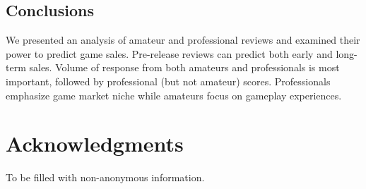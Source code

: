 \documentclass[letterpaper]{article}
\begin{document}
\subsection{Conclusions}
We presented an analysis of amateur and professional reviews and examined their power to predict game sales. Pre-release reviews can predict both early and long-term sales. Volume of response from both amateurs and professionals is most important, followed by professional (but not amateur) scores. Professionals emphasize game market niche while amateurs focus on gameplay experiences.

\section{Acknowledgments}
To be filled with non-anonymous information.



\end{document}
